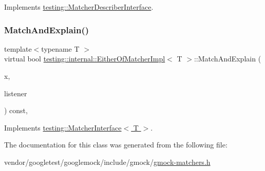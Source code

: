 Implements \hyperlink{classtesting_1_1_matcher_describer_interface_ad9f861588bd969b6e3e717f13bb94e7b}{testing\+::\+Matcher\+Describer\+Interface}.

\mbox{\label{classtesting_1_1internal_1_1_either_of_matcher_impl_af00ed8cd85c36f1e862bf85f776cee3b}} 
\subsubsection{\texorpdfstring{Match\+And\+Explain()}{MatchAndExplain()}}
{\footnotesize\ttfamily template$<$typename T $>$ \\
virtual bool \hyperlink{classtesting_1_1internal_1_1_either_of_matcher_impl}{testing\+::internal\+::\+Either\+Of\+Matcher\+Impl}$<$ T $>$\+::Match\+And\+Explain (\begin{DoxyParamCaption}\item[{T}]{x,  }\item[{\hyperlink{classtesting_1_1_match_result_listener}{Match\+Result\+Listener} $\ast$}]{listener }\end{DoxyParamCaption}) const\hspace{0.3cm}{\ttfamily [inline]}, {\ttfamily [virtual]}}



Implements \hyperlink{classtesting_1_1_matcher_interface_a296b43607cd99d60365f0e6a762777cf}{testing\+::\+Matcher\+Interface$<$ T $>$}.



The documentation for this class was generated from the following file\+:\begin{DoxyCompactItemize}
\item 
vendor/googletest/googlemock/include/gmock/\hyperlink{gmock-matchers_8h}{gmock-\/matchers.\+h}\end{DoxyCompactItemize}
